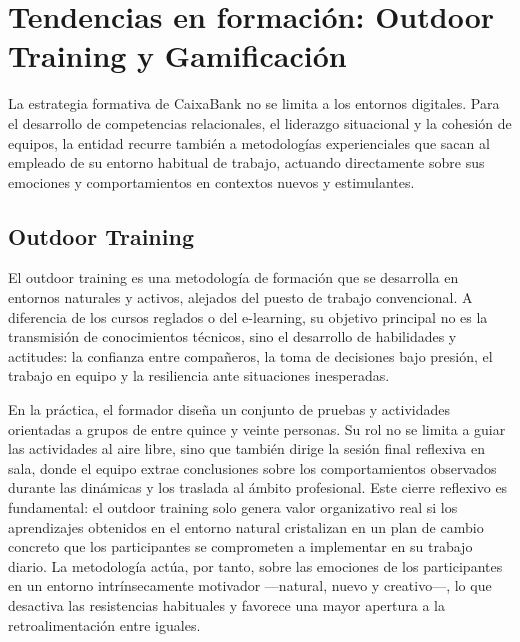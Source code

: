 

\section{Tendencias en formación: Outdoor Training y Gamificación}

La estrategia formativa de CaixaBank no se limita a los entornos digitales. Para el desarrollo de
competencias relacionales, el liderazgo situacional y la cohesión de equipos, la entidad recurre
también a metodologías experienciales que sacan al empleado de su entorno habitual de trabajo,
actuando directamente sobre sus emociones y comportamientos en contextos nuevos y estimulantes.

\subsection{Outdoor Training}

El outdoor training es una metodología de formación que se desarrolla en entornos naturales y
activos, alejados del puesto de trabajo convencional. A diferencia de los cursos reglados o del
e-learning, su objetivo principal no es la transmisión de conocimientos técnicos, sino el
desarrollo de habilidades y actitudes: la confianza entre compañeros, la toma de decisiones bajo
presión, el trabajo en equipo y la resiliencia ante situaciones inesperadas.

En la práctica, el formador diseña un conjunto de pruebas y actividades orientadas a grupos de
entre quince y veinte personas. Su rol no se limita a guiar las actividades al aire libre, sino
que también dirige la sesión final reflexiva en sala, donde el equipo extrae conclusiones
sobre los comportamientos observados durante las dinámicas y los traslada al ámbito profesional.
Este cierre reflexivo es fundamental: el outdoor training solo genera valor organizativo real si
los aprendizajes obtenidos en el entorno natural cristalizan en un plan de cambio concreto que
los participantes se comprometen a implementar en su trabajo diario. La metodología actúa, por
tanto, sobre las emociones de los participantes en un entorno intrínsecamente motivador —natural,
nuevo y creativo—, lo que desactiva las resistencias habituales y favorece una mayor apertura
a la retroalimentación entre iguales.


